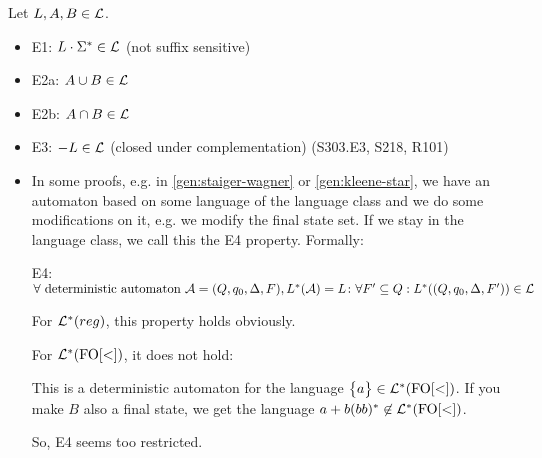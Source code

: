 Let $L,A,B \in \mathcal{L}$.
\begin{itemize}
\item E1: $L \cdot \Sigma^* \in \mathcal{L}$ (not suffix sensitive)
\item E2a: $A \cup B \in \mathcal{L}$
\item E2b: $A \cap B \in \mathcal{L}$
\item E3: $- L \in \mathcal{L}$ (closed under complementation) (S303.E3, S218, R101)

\item
In some proofs, e.g. in \ref{gen:staiger-wagner} or \ref{gen:kleene-star}, we have an automaton based on some language of the language class and we do some modifications on it, e.g. we modify the final state set. If we stay in the language class, we call this the E4 property. Formally:

E4: $\forall \text{ deterministic automaton } \mathcal{A} = (Q,q_0,\Delta,F), L^*(\mathcal{A}) = L \colon \forall F' \subseteq Q: L^*((Q,q_0,\Delta,F')) \in \mathcal{L}$

For $\mathcal{L}^*(reg)$, this property holds obviously.

For $\mathcal{L}^*(\mathrm{FO[<]})$, it does not hold:

  
This is a deterministic automaton for the language $\Set{a} \in \Lang^*(\mathrm{FO[<]})$. If you make $B$ also a final state, we get the language $a + b(bb)^* \not\in \mathcal{L}^*(\mathrm{FO[<]})$.

So, E4 seems too restricted.


\end{itemize}
